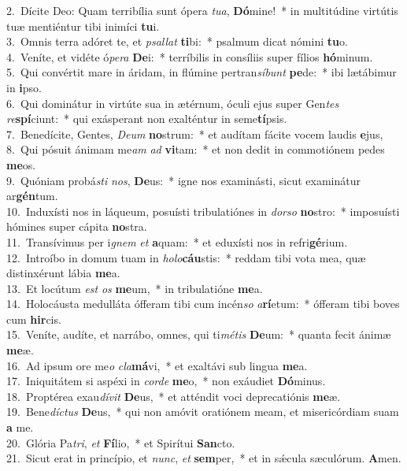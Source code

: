 {2.~}Dícite Deo: Quam terribília sunt ópera \textit{tu}\textit{a}, \textbf{Dó}mine!~* in multitúdine virtútis tuæ mentiéntur tibi inimíci \textbf{tu}i.\\
{3.~}Omnis terra adóret te, et \textit{psal}\textit{lat} \textbf{ti}bi:~* psalmum dicat nómini \textbf{tu}o.\\
{4.~}Veníte, et vidéte ó\textit{pe}\textit{ra} \textbf{De}i:~* terríbilis in consíliis super fílios \textbf{hó}minum.\\
{5.~}Qui convértit mare in áridam, in flúmine pertran\textit{sí}\textit{bunt} \textbf{pe}de:~* ibi lætábimur in \textbf{i}pso.\\
{6.~}Qui dominátur in virtúte sua in ætérnum, óculi ejus super Gen\textit{tes} \textit{re}\textbf{spí}ciunt:~* qui exásperant non exalténtur in seme\textbf{tí}psis.\\
{7.~}Benedícite, Gentes, \textit{De}\textit{um} \textbf{no}strum:~* et audítam fácite vocem laudis \textbf{e}jus,\\
{8.~}Qui pósuit ánimam me\textit{am} \textit{ad} \textbf{vi}tam:~* et non dedit in commotiónem pedes \textbf{me}os.\\
{9.~}Quóniam probá\textit{sti} \textit{nos}, \textbf{De}us:~* igne nos examinásti, sicut examinátur ar\textbf{gén}tum.\\
{10.~}Induxísti nos in láqueum, posuísti tribulatiónes in \textit{dor}\textit{so} \textbf{no}stro:~* imposuísti hómines super cápita \textbf{no}stra.\\
{11.~}Transívimus per i\textit{gnem} \textit{et} \textbf{a}quam:~* et eduxísti nos in refri\textbf{gé}rium.\\
{12.~}Introíbo in domum tuam in \textit{ho}\textit{lo}\textbf{cáu}stis:~* reddam tibi vota mea, quæ distinxérunt lábia \textbf{me}a.\\
{13.~}Et locútum \textit{est} \textit{os} \textbf{me}um,~* in tribulatióne \textbf{me}a.\\
{14.~}Holocáusta medulláta ófferam tibi cum incén\textit{so} \textit{a}\textbf{rí}etum:~* ófferam tibi boves cum \textbf{hir}cis.\\
{15.~}Veníte, audíte, et narrábo, omnes, qui ti\textit{mé}\textit{tis} \textbf{De}um:~* quanta fecit ánimæ \textbf{me}æ.\\
{16.~}Ad ipsum ore me\textit{o} \textit{cla}\textbf{má}vi,~* et exaltávi sub lingua \textbf{me}a.\\
{17.~}Iniquitátem si aspéxi in \textit{cor}\textit{de} \textbf{me}o,~* non exáudiet \textbf{Dó}minus.\\
{18.~}Proptérea exau\textit{dí}\textit{vit} \textbf{De}us,~* et atténdit voci deprecatiónis \textbf{me}æ.\\
{19.~}Bene\textit{dí}\textit{ctus} \textbf{De}us,~* qui non amóvit oratiónem meam, et misericórdiam suam \textbf{a} me.\\
{20.~}Glória Pa\textit{tri}, \textit{et} \textbf{Fí}lio,~* et Spirítui \textbf{San}cto.\\
{21.~}Sicut erat in princípio, et \textit{nunc}, \textit{et} \textbf{sem}per,~* et in sǽcula sæculórum. \textbf{A}men.\\
